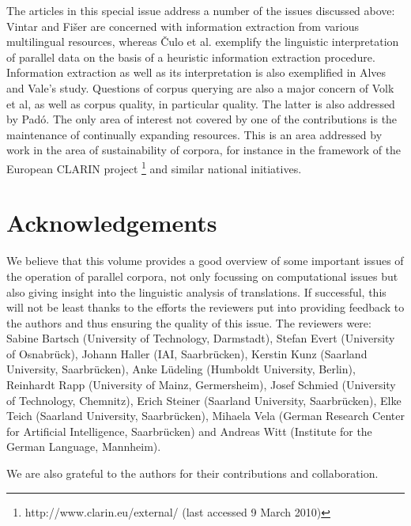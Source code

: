 \documentclass[output=paper]{LSP/langsci}
\begin{document}
The articles in this special issue address a number of the issues discussed above: Vintar and Fišer are concerned with information extraction from various multilingual resources, whereas Čulo et al. exemplify the linguistic interpretation of parallel data on the basis of a heuristic information extraction procedure. Information extraction as well as its interpretation is also exemplified in Alves and Vale's study. Questions of corpus querying are also a major concern of Volk et al, as well as corpus quality, in particular  quality. The latter is also addressed by Padó. The only area of interest not covered by one of the contributions is the maintenance of continually expanding resources. This is an area addressed by work in the area of sustainability of corpora, for instance in the framework of the European CLARIN project \footnote{http://www.clarin.eu/external/ (last accessed 9 March 2010)} and similar national initiatives.

\section{Acknowledgements} 

We believe that this volume provides a good overview of some important issues of the operation of parallel corpora, not only focussing on computational issues but also giving insight into the linguistic analysis of translations. If successful, this will not be least thanks to the efforts the reviewers put into providing feedback to the authors and thus ensuring the quality of this issue. The reviewers were: Sabine Bartsch (University of Technology, Darmstadt), Stefan Evert (University of Osnabrück), Johann Haller (IAI, Saarbrücken), Kerstin Kunz (Saarland University, Saarbrücken), Anke Lüdeling (Humboldt University, Berlin), Reinhardt Rapp (University of Mainz, Germersheim), Josef Schmied (University of Technology, Chemnitz), Erich Steiner (Saarland University, Saarbrücken), Elke Teich (Saarland University, Saarbrücken), Mihaela Vela (German Research Center for Artificial Intelligence, Saarbrücken) and Andreas Witt (Institute for the German Language, Mannheim).

We are also grateful to the authors for their contributions and collaboration. 

{\sloppy
\printbibliography[heading=subbibliography,notkeyword=this] 
}
\end{document}
